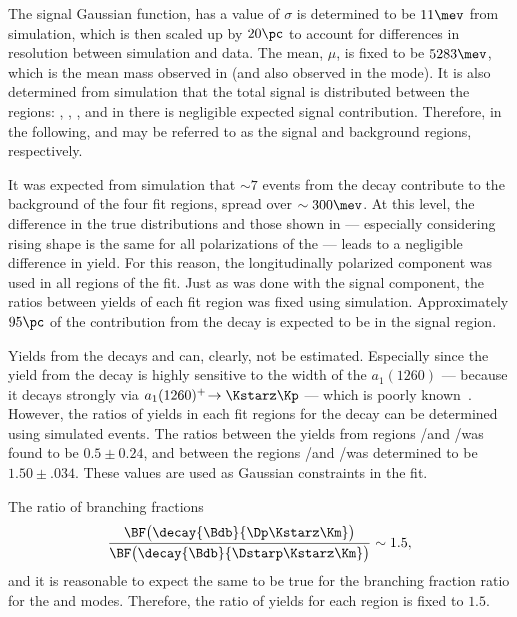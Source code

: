 The signal Gaussian function,
has a value of $\sigma$ is determined to be $11\mev$ from simulation, which is then scaled up by
$20\pc$ to account for differences in resolution between simulation and data.
The mean, $\mu$, is fixed to be $5283\mev$, which is the mean mass observed in
\decay{\Bp}{\Dz\pip} (and also observed in the \Bs mode).
It is also determined from simulation that the total signal is distributed between the regions:
\pc, \pc, \pc, and in \rD there is negligible expected signal contribution.
Therefore, in the following, \rA and \rD may be referred to as the signal and background regions,
respectively.

It was expected from simulation that $\sim7$ events from the decay \btodsstrphi contribute to the
background of the four fit regions, spread over $\sim300\mev$.
At this level, the difference in the true distributions and those shown in 
--- especially considering rising shape is the same for all polarizations of the \phii ---
leads to a negligible difference in yield.
For this reason, the longitudinally polarized \btodsstrphi component was used in all regions of the
fit.
Just as was done with the signal component, the ratios between yields of each fit region was fixed
using simulation.
Approximately $95\pc$ of the contribution from the decay \btodsstrphi is expected to be in the
signal region.

Yields from the decays \bstodskstrk and \bstodsstrkstrk can, clearly, not be estimated.
Especially since the yield from the decay \bstodskstrk is highly sensitive to the width of the
$a_1(1260)$ --- because it decays strongly via $a_1(1260)^+\!\to\Kstarz\Kp$ --- which is poorly
known~\cite{PDG2012}.
However, the ratios of yields in each fit regions for the decay \bstodskstrk can be determined
using simulated events.
The ratios between the yields from regions \rA/\rB and \rC/\rD was found to be $0.5\pm0.24$, and
between the regions \rA/\rC and \rB/\rD was determined to be $1.50\pm.034$.
These values are used as Gaussian constraints in the fit.

The ratio of branching fractions
\begin{equation}
  \frac{\BF\big(\decay{\Bdb}{\Dp\Kstarz\Km}\big)}
  {\BF\big(\decay{\Bdb}{\Dstarp\Kstarz\Km}\big)}
  \sim 1.5,
\end{equation}
and it is reasonable to expect the same to be true for the branching fraction ratio for the
\bstodskstrk and \bstodsstrkstrk modes.
Therefore, the ratio of yields for each region is fixed to $1.5$.

